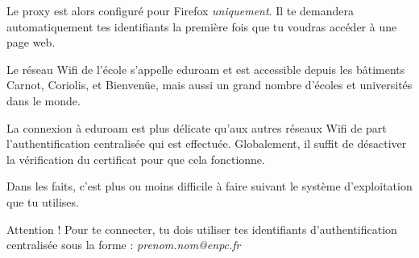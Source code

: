 \documentclass{../templates/enpc-ki/ki019}
\begin{document}
        Le proxy est alors configuré pour Firefox \emph{uniquement}. Il te demandera automatiquement tes identifiants la première fois que tu voudras accéder à une page web.





    Le réseau Wifi de l’école s’appelle eduroam et est accessible depuis les bâtiments Carnot, Coriolis, et Bienvenüe, mais aussi un grand nombre d'écoles et universités dans le monde.

    La connexion à eduroam est plus délicate qu’aux autres réseaux Wifi de part l'authentification centralisée qui est effectuée. Globalement, il suffit de désactiver la vérification du certificat pour que cela fonctionne.

    Dans les faits, c’est plus ou moins difficile à faire suivant le système d’exploitation que tu utilises.

    Attention ! Pour te connecter, tu dois utiliser tes identifiants d’authentification centralisée sous la forme : \emph{prenom.nom@enpc.fr}

\newpage
\end{document}
